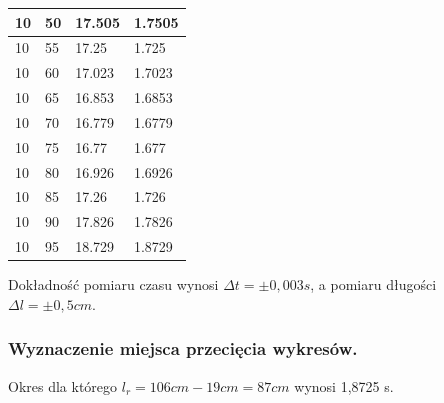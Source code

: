 \documentclass[a4paper, 11pt]{article}
\begin{document}
\begin{adjustwidth}{-0.125\textwidth}{-0.125\textwidth}
\begin{center}
\begin{tabular}{|l|l|l|l|}
			10             & 50           & 17.505   & 1.7505    \\ \hline
			10             & 55           & 17.25    & 1.725     \\ \hline
			10             & 60           & 17.023   & 1.7023    \\ \hline
			10             & 65           & 16.853   & 1.6853    \\ \hline
			10             & 70           & 16.779   & 1.6779    \\ \hline
			10             & 75           & 16.77    & 1.677     \\ \hline
			10             & 80           & 16.926   & 1.6926    \\ \hline
			10             & 85           & 17.26    & 1.726     \\ \hline
			10             & 90           & 17.826   & 1.7826    \\ \hline
			10             & 95           & 18.729   & 1.8729    \\ \hline
		\end{tabular}
	\end{center}
\end{adjustwidth}
Dokładność pomiaru czasu wynosi $\Delta t = \pm0,003s$, a pomiaru długości $\Delta l = \pm0,5cm$.

\subsubsection{Wyznaczenie miejsca przecięcia wykresów.}
\begin{center}
\end{center}
Okres dla którego $l_r = 106cm - 19cm = 87cm$ wynosi 1,8725 s.
\end{document}
